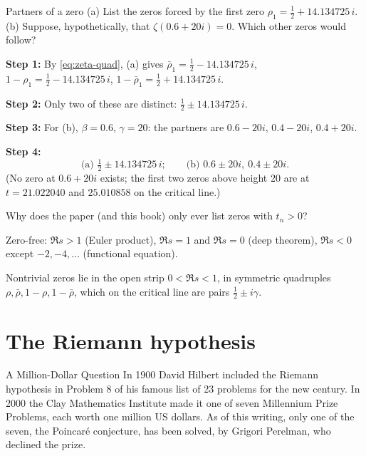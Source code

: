 \begin{sample}{Partners of a zero}
(a) List the zeros forced by the first zero $\rho_1=\tfrac12+14.134725\,i$. (b) Suppose, hypothetically, that $\zeta(0.6+20i)=0$. Which other zeros would follow?

\textbf{Step 1:} By \cref{eq:zeta-quad}, (a) gives $\bar\rho_1=\tfrac12-14.134725\,i$, $1-\rho_1=\tfrac12-14.134725\,i$, $1-\bar\rho_1=\tfrac12+14.134725\,i$.

\textbf{Step 2:} Only two of these are distinct: $\tfrac12\pm14.134725\,i$.

\textbf{Step 3:} For (b), $\beta=0.6$, $\gamma=20$: the partners are $0.6-20i$, $0.4-20i$, $0.4+20i$.

\textbf{Step 4:}
\[
\boxed{\text{(a) } \tfrac12\pm14.134725\,i;\qquad\text{(b) } 0.6\pm20i,\ 0.4\pm20i.}
\]
(No zero at $0.6+20i$ exists; the first two zeros above height 20 are at $t=21.022040$ and $25.010858$ on the critical line.)
\end{sample}

\begin{checkpoint}
Why does the paper (and this book) only ever list zeros with $t_n>0$?
\end{checkpoint}

\begin{keyideas}
\item Zero-free: $\Re s>1$ (Euler product), $\Re s=1$ and $\Re s=0$ (deep theorem), $\Re s<0$ except $-2,-4,\dots$ (functional equation).
\item Nontrivial zeros lie in the open strip $0<\Re s<1$, in symmetric quadruples $\rho,\bar\rho,1-\rho,1-\bar\rho$, which on the critical line are pairs $\tfrac12\pm i\gamma$.
\end{keyideas}

\section{The Riemann hypothesis}\label{sec:zeta-rh}
\begin{didyouknow}{A Million-Dollar Question}
In 1900 David Hilbert included the Riemann hypothesis in Problem 8 of his famous list of 23 problems for the new century. In 2000 the Clay Mathematics Institute made it one of seven Millennium Prize Problems, each worth one million US dollars. As of this writing, only one of the seven, the Poincar\'e conjecture, has been solved, by Grigori Perelman, who declined the prize.
\end{didyouknow}

